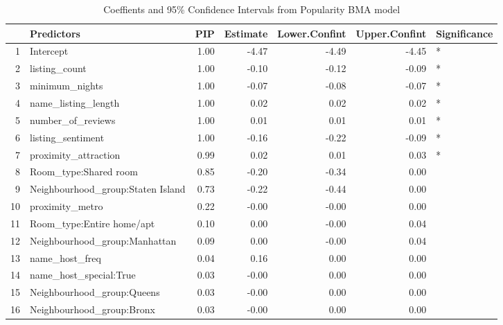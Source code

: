 \begin{table}[ht]
\centering
\begin{tabular}{rlrrrrl}
  \hline
 & Predictors & PIP & Estimate & Lower.Confint & Upper.Confint & Significance \\ 
  \hline
1 & Intercept & 1.00 & -4.47 & -4.49 & -4.45 & * \\ 
  2 & listing\_count & 1.00 & -0.10 & -0.12 & -0.09 & * \\ 
  3 & minimum\_nights & 1.00 & -0.07 & -0.08 & -0.07 & * \\ 
  4 & name\_listing\_length & 1.00 & 0.02 & 0.02 & 0.02 & * \\ 
  5 & number\_of\_reviews & 1.00 & 0.01 & 0.01 & 0.01 & * \\ 
  6 & listing\_sentiment & 1.00 & -0.16 & -0.22 & -0.09 & * \\ 
  7 & proximity\_attraction & 0.99 & 0.02 & 0.01 & 0.03 & * \\ 
  8 & Room\_type:Shared room & 0.85 & -0.20 & -0.34 & 0.00 &  \\ 
  9 & Neighbourhood\_group:Staten Island & 0.73 & -0.22 & -0.44 & 0.00 &  \\ 
  10 & proximity\_metro & 0.22 & -0.00 & -0.00 & 0.00 &  \\ 
  11 & Room\_type:Entire home/apt & 0.10 & 0.00 & -0.00 & 0.04 &  \\ 
  12 & Neighbourhood\_group:Manhattan & 0.09 & 0.00 & -0.00 & 0.04 &  \\ 
  13 & name\_host\_freq & 0.04 & 0.16 & 0.00 & 0.00 &  \\ 
  14 & name\_host\_special:True & 0.03 & -0.00 & 0.00 & 0.00 &  \\ 
  15 & Neighbourhood\_group:Queens & 0.03 & -0.00 & 0.00 & 0.00 &  \\ 
  16 & Neighbourhood\_group:Bronx & 0.03 & -0.00 & 0.00 & 0.00 &  \\ 
   \hline
\end{tabular}
\caption{Coeffients and 95\% Confidence Intervals from Popularity BMA model} 
\end{table}
